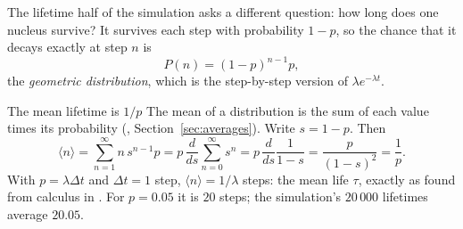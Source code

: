 \begin{figure}[htbp]
\centering
{}
\end{figure}

The lifetime half of the simulation asks a different question: how long does one nucleus survive? It
survives each step with probability $1-p$, so the chance that it decays exactly at step $n$ is
\[
P(n)=(1-p)^{n-1}p,
\]
the \emph{geometric distribution}, which is the step-by-step version of $\lambda e^{-\lambda t}$.

\begin{derivbox}{The mean lifetime is $1/p$}
The mean of a distribution is the sum of each value times its probability (,
Section~\ref{sec:averages}). Write $s=1-p$. Then
\[
\langle n\rangle=\sum_{n=1}^{\infty}n\,s^{n-1}p=p\,\frac{d}{ds}\sum_{n=0}^{\infty}s^{n}
=p\,\frac{d}{ds}\frac{1}{1-s}=\frac{p}{(1-s)^2}=\frac1p .
\]
With $p=\lambda\Delta t$ and $\Delta t=1$ step, $\langle n\rangle=1/\lambda$ steps: the mean life $\tau$,
exactly as found from calculus in . For $p=0.05$ it is $20$ steps; the simulation's
$20\,000$ lifetimes average $20.05$.
\end{derivbox}

